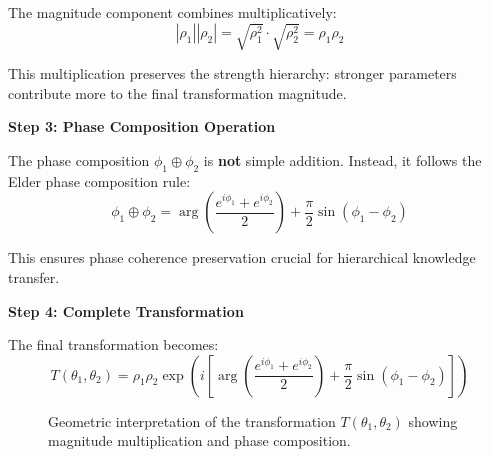 The magnitude component combines multiplicatively:
\begin{equation}
|\rho_1||\rho_2| = \sqrt{\rho_1^2} \cdot \sqrt{\rho_2^2} = \rho_1 \rho_2
\end{equation}

This multiplication preserves the strength hierarchy: stronger parameters contribute more to the final transformation magnitude.

\textbf{Step 3: Phase Composition Operation}

The phase composition $\phi_1 \oplus \phi_2$ is \textbf{not} simple addition. Instead, it follows the Elder phase composition rule:
\begin{equation}
\phi_1 \oplus \phi_2 = \arg\left(\frac{e^{i\phi_1} + e^{i\phi_2}}{2}\right) + \frac{\pi}{2}\sin(\phi_1 - \phi_2)
\end{equation}

This ensures phase coherence preservation crucial for hierarchical knowledge transfer.

\textbf{Step 4: Complete Transformation}

The final transformation becomes:
\begin{equation}
T(\theta_1, \theta_2) = \rho_1 \rho_2 \exp\left(i\left[\arg\left(\frac{e^{i\phi_1} + e^{i\phi_2}}{2}\right) + \frac{\pi}{2}\sin(\phi_1 - \phi_2)\right]\right)
\end{equation}

\begin{figure}[htbp]
\centering
{}
\caption{Geometric interpretation of the transformation $T(\theta_1, \theta_2)$ showing magnitude multiplication and phase composition.}
\end{figure}

